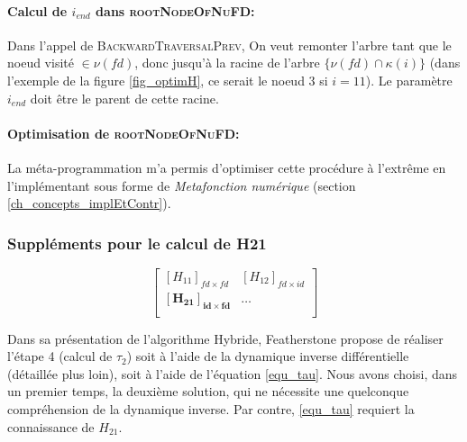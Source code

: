 \documentclass{report}
\begin{document}
\paragraph{Calcul de $i_{end}$ dans \textsc{rootNodeOfNuFD}:}
Dans l'appel de \textsc{BackwardTraversalPrev}, On veut remonter l'arbre tant que le noeud visité $\in \nu(fd)$, donc jusqu'à la racine de l'arbre $\{\nu(fd) \cap \kappa(i)\}$ (dans l'exemple de la figure \ref{fig_optimH}, ce serait le noeud $3$ si $i=11$). Le paramètre $i_{end}$ doit être le parent de cette racine.


\paragraph{Optimisation de \textsc{rootNodeOfNuFD}:}
La méta-programmation m'a permis d'optimiser cette procédure à l'extrême en l'implémentant sous forme de \emph{Metafonction numérique} (section \ref{ch_concepts_implEtContr}).


\subsubsection{Suppléments pour le calcul de H21}

\setlength{\intextsep}{2pt}
\begin{figure}
  \begin{minipage}[t]{0.35\textwidth}
  \begin{spacing}{1.5}
  \begin{equation*}
  \begin{bmatrix}
    \left[H_{11}\right]_{fd \times fd} & \left[H_{12}\right]_{fd \times id} \\
    \mathbf{\left[H_{21}\right]_{id \times fd}} & \ldots \\
  \end{bmatrix}
  \end{equation*}
  \end{spacing}
  \end{minipage}
\end{figure}

Dans sa présentation de l'algorithme Hybride, Featherstone propose de réaliser l'étape 4 (calcul de $\tau_2$) soit à l'aide de la dynamique inverse différentielle (détaillée plus loin), soit à l'aide de l'équation \eqref{equ_tau}. Nous avons choisi, dans un premier temps, la deuxième solution, qui ne nécessite une quelconque compréhension de la dynamique inverse. Par contre, \eqref{equ_tau} requiert la connaissance de $H_{21}$.
\end{document}
